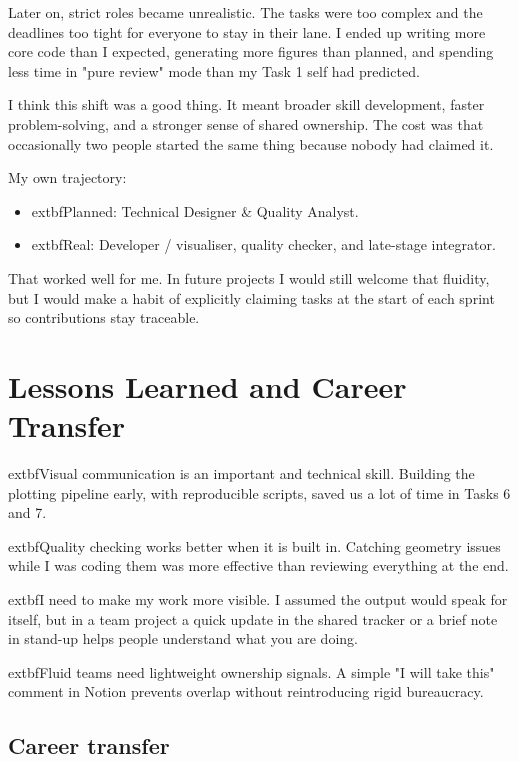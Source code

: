 \noindent Later on, strict roles became unrealistic. The tasks were too complex and the deadlines too tight for everyone to stay in their lane. I ended up writing more core code than I expected, generating more figures than planned, and spending less time in "pure review" mode than my Task 1 self had predicted.


\noindent I think this shift was a good thing. It meant broader skill development, faster problem-solving, and a stronger sense of shared ownership. The cost was that occasionally two people started the same thing because nobody had claimed it.


\noindent My own trajectory:

\begin{itemize}[leftmargin=1.5em]
\item 	extbf{Planned:} Technical Designer \& Quality Analyst.
\item 	extbf{Real:} Developer / visualiser, quality checker, and late-stage integrator.
\end{itemize}

\noindent That worked well for me. In future projects I would still welcome that fluidity, but I would make a habit of explicitly claiming tasks at the start of each sprint so contributions stay traceable.


\chapter{Lessons Learned and Career Transfer}


\noindent 	extbf{Visual communication is an important and technical skill.} Building the plotting pipeline early, with reproducible scripts, saved us a lot of time in Tasks 6 and 7.


\noindent 	extbf{Quality checking works better when it is built in.} Catching geometry issues while I was coding them was more effective than reviewing everything at the end.


\noindent 	extbf{I need to make my work more visible.} I assumed the output would speak for itself, but in a team project a quick update in the shared tracker or a brief note in stand-up helps people understand what you are doing.


\noindent 	extbf{Fluid teams need lightweight ownership signals.} A simple "I will take this" comment in Notion prevents overlap without reintroducing rigid bureaucracy.


\section{Career transfer}


